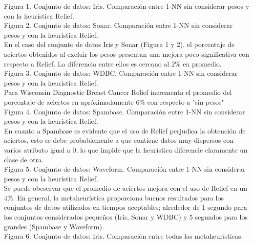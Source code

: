 \documentclass{ci5652}
\begin{document}
Figura 1. Conjunto de datos: Iris. Comparación entre 1-NN sin considerar pesos y con la heurística Relief.\\

Figura 2. Conjunto de datos: Sonar. Comparación entre 1-NN sin considerar pesos y con la heurística Relief.\\

En el caso del conjunto de datos Iris y Sonar (Figura 1 y 2), el porcentaje de aciertos obtenidos al excluir los pesos presentan una mejora poco significativa con respecto a Relief. La diferencia entre ellos es cercano al 2\% en promedio. \\

Figura 3. Conjunto de datos: WDBC. Comparación entre 1-NN sin considerar pesos y con la heurística Relief.\\

Para Wisconsin Diagnostic Breast Cancer Relief incrementa el promedio del porcentaje de aciertos en apróximadamente 6\% con respecto a "sin pesos"\\ 

Figura 4. Conjunto de datos: Spambase. Comparación entre 1-NN sin considerar pesos y con la heurística Relief.\\

En cuanto a Spambase es evidente que el uso de Relief perjudica la obtención de aciertos, esto se debe probablemente a que contiene datos muy dispersos con varios atributo igual a 0, lo que impide que la heurística diferencie claramente un clase de otra.\\

Figura 5. Conjunto de datos: Waveform. Comparación entre 1-NN sin considerar pesos y con la heurística Relief.\\

Se puede obeservar que el promedio de aciertos mejora con el uso de Relief en un 4\%. En general, la metaheurística proporciona buenos resultados para los conjuntos de datos utilizados en tiempos aceptables; alrededor de 1 segundo para los conjuntos considerados pequeños (Iris, Sonar y WDBC) y 5 segundos para los grandes (Spambase y Waveform).\\

Figura 6. Conjunto de datos: Iris. Comparación entre todas las metaheurísticas.
\end{document}
